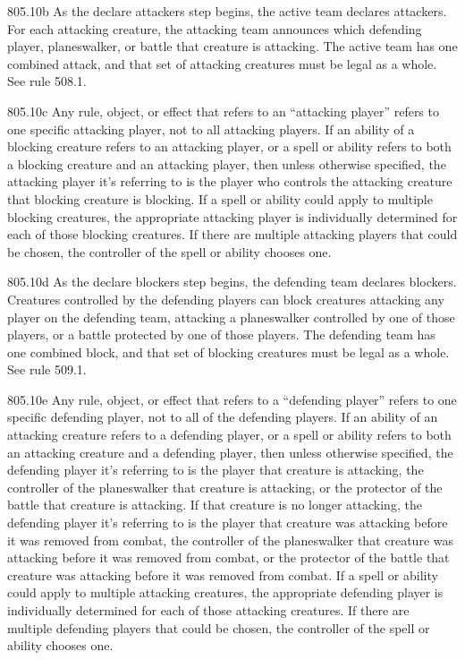 805.10b As the declare attackers step begins, the active team declares attackers. For each attacking creature, the attacking team announces which defending player, planeswalker, or battle that creature is attacking. The active team has one combined attack, and that set of attacking creatures must be legal as a whole. See rule 508.1.

805.10c Any rule, object, or effect that refers to an “attacking player” refers to one specific attacking player, not to all attacking players. If an ability of a blocking creature refers to an attacking player, or a spell or ability refers to both a blocking creature and an attacking player, then unless otherwise specified, the attacking player it’s referring to is the player who controls the attacking creature that blocking creature is blocking. If a spell or ability could apply to multiple blocking creatures, the appropriate attacking player is individually determined for each of those blocking creatures. If there are multiple attacking players that could be chosen, the controller of the spell or ability chooses one.

805.10d As the declare blockers step begins, the defending team declares blockers. Creatures controlled by the defending players can block creatures attacking any player on the defending team, attacking a planeswalker controlled by one of those players, or a battle protected by one of those players. The defending team has one combined block, and that set of blocking creatures must be legal as a whole. See rule 509.1.

805.10e Any rule, object, or effect that refers to a “defending player” refers to one specific defending player, not to all of the defending players. If an ability of an attacking creature refers to a defending player, or a spell or ability refers to both an attacking creature and a defending player, then unless otherwise specified, the defending player it’s referring to is the player that creature is attacking, the controller of the planeswalker that creature is attacking, or the protector of the battle that creature is attacking. If that creature is no longer attacking, the defending player it’s referring to is the player that creature was attacking before it was removed from combat, the controller of the planeswalker that creature was attacking before it was removed from combat, or the protector of the battle that creature was attacking before it was removed from combat. If a spell or ability could apply to multiple attacking creatures, the appropriate defending player is individually determined for each of those attacking creatures. If there are multiple defending players that could be chosen, the controller of the spell or ability chooses one.

